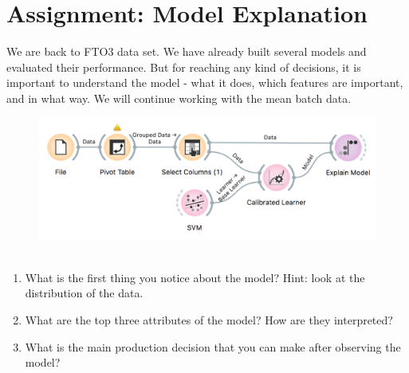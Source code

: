 \chapter{Assignment: Model Explanation}
\label{hw:model-explanation}

 We are back to FTO3 data set. We have already built several models and evaluated their performance. But for reaching any kind of decisions, it is important to understand the model - what it does, which features are important, and in what way. We will continue working with the mean batch data.

\begin{figure}[h]
  \centering
  \includegraphics[width=\linewidth]{model-explanation.png}%
  \caption{$\;$}
  \label{fig:wf1}
\end{figure}

\begin{enumerate}
    \item What is the first thing you notice about the model? Hint: look at the distribution of the data.
    \item What are the top three attributes of the model? How are they interpreted?
    \item What is the main production decision that you can make after observing the model?
\end{enumerate}
